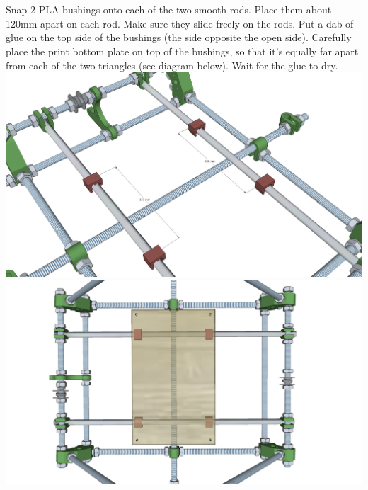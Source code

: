 \documentclass[twoside,a4paper,titlepage]{memoir}
\begin{document}
	\section{}
	Snap 2 PLA bushings onto each of the two smooth rods. Place them about 120mm apart on each rod.
	Make sure they slide freely on the rods. Put a dab of glue on the top side of the bushings (the side
	opposite the open side). Carefully place the print bottom plate on top of the bushings, so that it's equally
	far apart from each of the two triangles (see diagram below). Wait for the glue to dry.\\
	\includegraphics[width=1\linewidth]{graphics/ch6_11_1.png}
	\includegraphics[width=1\linewidth]{graphics/ch6_11_2.png}
	
\end{document}
